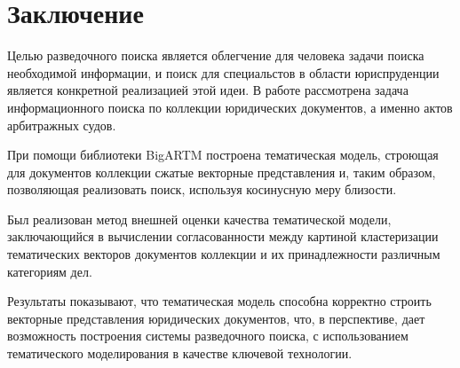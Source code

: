 \documentclass[12pt]{article}
\begin{document}
\section{Заключение}
Целью разведочного поиска является облегчение для человека задачи поиска необходимой информации, и поиск для специальстов в области юриспруденции является конкретной реализацией этой идеи. В работе рассмотрена задача информационного поиска по коллекции юридических документов, а именно актов арбитражных судов. 

При помощи библиотеки BigARTM построена тематическая модель, строющая для документов коллекции сжатые векторные представления и, таким образом, позволяющая реализовать поиск, используя косинусную меру близости.

Был реализован метод внешней оценки качества тематической модели, заключающийся в вычислении согласованности между картиной кластеризации тематических векторов документов коллекции и их принадлежности различным категориям дел.

Результаты показывают, что тематическая модель способна корректно строить векторные представления юридических документов, что, в перспективе, дает возможность построения системы разведочного поиска, с использованием тематического моделирования в качестве ключевой технологии.











\end{document}
